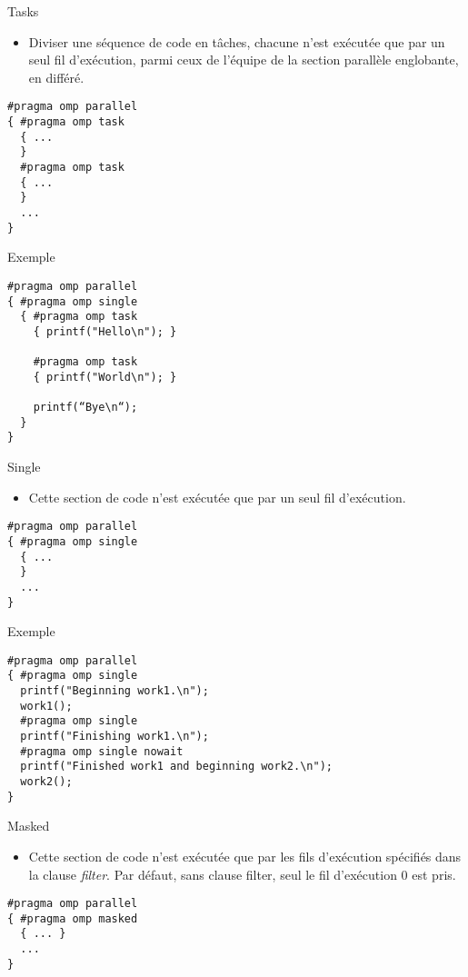 \documentclass[10pt]{beamer}
\begin{document}
\begin{frame}[fragile]{Tasks}

  \begin{itemize}
    \item Diviser une séquence de code en tâches, chacune n'est exécutée que par un seul fil d'exécution, parmi ceux de l'équipe de la section parallèle englobante, en différé.
  \end{itemize}
  \begin{verbatim}
#pragma omp parallel
{ #pragma omp task
  { ...
  }
  #pragma omp task
  { ...
  }
  ...
}
  \end{verbatim}
\end{frame}

\begin{frame}[fragile]{Exemple}

  \begin{verbatim}
#pragma omp parallel
{ #pragma omp single
  { #pragma omp task
    { printf("Hello\n"); }

    #pragma omp task
    { printf("World\n"); }

    printf(“Bye\n“);
  }
}
  \end{verbatim}
\end{frame}

\begin{frame}[fragile]{Single}

  \begin{itemize}
    \item Cette section de code n'est exécutée que par un seul fil d'exécution.
  \end{itemize}
  \begin{verbatim}
#pragma omp parallel
{ #pragma omp single
  { ...
  }
  ...
}
  \end{verbatim}
\end{frame}

\begin{frame}[fragile]{Exemple}

  \begin{verbatim}
#pragma omp parallel
{ #pragma omp single
  printf("Beginning work1.\n");
  work1();
  #pragma omp single
  printf("Finishing work1.\n");
  #pragma omp single nowait
  printf("Finished work1 and beginning work2.\n");
  work2();
}
  \end{verbatim}
\end{frame}

\begin{frame}[fragile]{Masked}

  \begin{itemize}
    \item Cette section de code n'est exécutée que par les fils d'exécution spécifiés dans la clause \textit{filter}. Par défaut, sans clause filter, seul le fil d'exécution 0 est pris.
  \end{itemize}
  \begin{verbatim}
#pragma omp parallel
{ #pragma omp masked
  { ... }
  ...
}
  \end{verbatim}
\end{frame}
\end{document}
